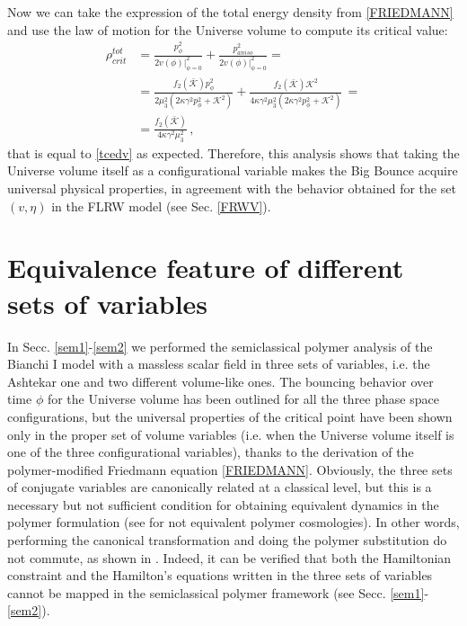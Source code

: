 \documentclass[aps,prd,twocolumn,nofootinbib,superscriptaddress]{revtex4-2}
\begin{document}
Now we can take the expression of the total energy density from \eqref{FRIEDMANN} and use the law of motion for the Universe volume to compute its critical value:
\begin{equation}
	\begin{aligned}
	\rho^{tot}_{crit}&=\frac{p_\phi^2}{2v(\phi)|_{\phi=0}^2}+\frac{p_{aniso}^2}{2v(\phi)|_{\phi=0}^2}=\\&=\frac{f_2(\bar{\mathcal{K}})p_\phi^2}{2\mu_3^2(2\kappa\gamma^2p_\phi^2+\mathcal{K}^2)}+\frac{f_2(\bar{\mathcal{K}})\mathcal{K}^2}{4\kappa\gamma^2\mu_3^2(2\kappa\gamma^2p_\phi^2+\mathcal{K}^2)}\,=\\&=\frac{f_2(\bar{\mathcal{K}})}{4\kappa\gamma^2\mu_3^2}\,,
	\end{aligned}
\end{equation}
that is equal to \eqref{tcedv} as expected. Therefore, this analysis shows that taking the Universe volume itself as a configurational variable makes the Big Bounce acquire universal physical properties, in agreement with the behavior obtained for the set $(v,\eta)$ in the FLRW model (see Sec. \ref{FRWV}). 

\section{Equivalence feature of different sets of variables}\label{discussion}
In Secc. \ref{sem1}-\ref{sem2} we performed the semiclassical polymer analysis of the Bianchi I model with a massless scalar field in three sets of variables, i.e. the Ashtekar one and two different volume-like ones. The bouncing behavior over time $\phi$ for the Universe volume has been outlined for all the three phase space configurations, but the universal properties of the critical point have been shown only in the proper set of volume variables (i.e. when the Universe volume itself is one of the three configurational variables), thanks to the derivation of the polymer-modified Friedmann equation \eqref{FRIEDMANN}. Obviously, the three sets of conjugate variables are canonically related at a classical level, but this is a necessary but not sufficient condition for obtaining equivalent dynamics in the polymer formulation (see \cite{crino,EBianchiIX,Ant,Review} for not equivalent polymer cosmologies). In other words, performing the canonical transformation and doing the polymer substitution do not commute, as shown in \cite{EFG}. Indeed, it can be verified that both the Hamiltonian constraint and the Hamilton's equations written in the three sets of variables cannot be mapped in the semiclassical polymer framework (see Secc. \ref{sem1}-\ref{sem2}).
\end{document}
